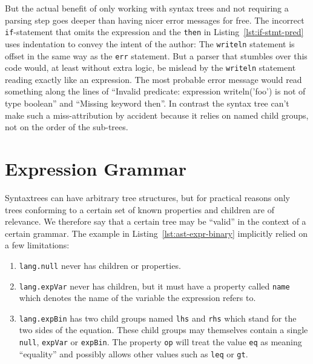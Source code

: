\documentclass[sigconf,natbib=false]{acmart}
\begin{document}
But the actual benefit of only working with syntax trees and not requiring a parsing step goes deeper than having nicer error messages for free. The incorrect \texttt{if}-statement that omits the expression and the \texttt{then} in Listing~\ref{lst:if-stmt-pred} uses indentation to convey the intent of the author: The \texttt{writeln} statement is offset in the same way as the \texttt{err} statement. But a parser that stumbles over this code would, at least without extra logic, be mislead by the \texttt{writeln} statement reading exactly like an expression. The most probable error message would read something along the lines of \enquote{Invalid predicate: expression writeln('foo') is not of type boolean} and \enquote{Missing keyword then}. In contrast the syntax tree can't make such a miss-attribution by accident because it relies on named child groups, not on the order of the sub-trees.

\section{Expression Grammar}
\label{sec:expression-grammar}

Syntaxtrees can have arbitrary tree structures, but for practical reasons only trees conforming to a certain set of known properties and children are of relevance. We therefore say that a certain tree may be \enquote{valid} in the context of a certain grammar. The example in Listing~\ref{lst:ast-expr-binary} implicitly relied on a few limitations:

\begin{enumerate}
\item \label{itm:lang-exp-null} \texttt{lang.null} never has children or properties.

\item \label{itm:lang-exp-var} \texttt{lang.expVar} never has children, but it must have a property called \texttt{name} which denotes the name of the variable the expression refers to.

\item \label{itm:lang-exp-bin} \texttt{lang.expBin} has two child groups named \texttt{lhs} and \texttt{rhs} which stand for the two sides of the equation. These child groups may themselves contain a single \texttt{null}, \texttt{expVar} or \texttt{expBin}. The property \texttt{op} will treat the value \texttt{eq} as meaning \enquote{equality} and possibly allows other values such as \texttt{leq} or \texttt{gt}.
\end{enumerate}
\end{document}
